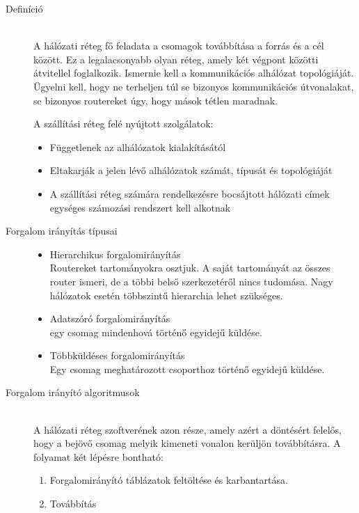 \documentclass[margin=0px]{article}
\begin{document}
\begin{description}
    \item[Definíció] \hfill \\
        A hálózati réteg fő feladata a csomagok továbbítása a forrás és a cél között. Ez a legalacsonyabb olyan réteg, amely két végpont közötti átvitellel foglalkozik. Ismernie kell a kommunikációs alhálózat topológiáját. Ügyelni kell, hogy ne terheljen túl se bizonyos kommunikációs útvonalakat, se bizonyos routereket úgy, hogy mások tétlen maradnak.

        A szállítási réteg felé nyújtott szolgálatok:
        \begin{itemize}
            \item Függetlenek az alhálózatok kialakításától
            \item Eltakarják a jelen lévő alhálózatok számát, típusát és topológiáját
            \item A szállítási réteg számára rendelkezésre bocsájtott hálózati címek egységes számozási rendszert kell alkotnak
        \end{itemize}
    \item[Forgalom irányítás típusai] \hfill
        \begin{itemize}
            \item Hierarchikus forgalomirányítás\\
                  Routereket tartományokra osztjuk. A saját tartományát az összes router ismeri, de a többi belső szerkezetéről nincs tudomása. Nagy hálózatok esetén többszintű hierarchia lehet szükséges.
            \item Adatszóró forgalomirányítás\\
                  egy csomag mindenhová történő egyidejű küldése.
            \item Többküldéses forgalomirányítás\\
                  Egy csomag meghatározott csoporthoz történő egyidejű küldése.

        \end{itemize}

    \item[Forgalom irányító algoritmusok] \hfill \\
        A hálózati réteg szoftverének azon része, amely azért a döntésért felelős, hogy a bejövő csomag melyik kimeneti vonalon kerüljön továbbításra. A folyamat két lépésre bontható:
        \begin{enumerate}
            \item Forgalomirányító táblázatok feltöltése és karbantartása.
            \item Továbbítás
        \end{enumerate}


\end{description}
\end{document}
